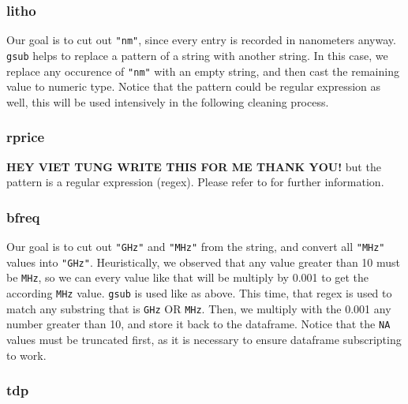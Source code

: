 \subsubsection*{litho}


Our goal is to cut out \verb|"nm"|, since every entry is recorded in nanometers anyway. \texttt{gsub} helps to replace a pattern 
of a string with another string. In this case, we replace any occurence of \verb|"nm"| with an empty string, and then cast the remaining 
value to numeric type. Notice that the pattern could be regular expression as well, this will be used intensively in the following cleaning
process.

\subsubsection*{rprice}


\textbf{HEY VIET TUNG WRITE THIS FOR ME THANK YOU!}
but the pattern is a regular expression (regex). Please refer to 
for further information.

\subsubsection*{bfreq}


Our goal is to cut out \verb|"GHz"| and \verb|"MHz"| from the string, and convert all \verb|"MHz"| values into \verb|"GHz"|. Heuristically,
we observed that any value greater than 10 must be \verb|MHz|, so we can every value like that will be multiply by 0.001 to get 
the according \verb|MHz| value. \texttt{gsub} is used like as above. This time, that regex is used to match any substring that is 
\verb|GHz| OR \verb|MHz|. Then, we multiply with the 0.001 any number greater than 10, and store it back to the dataframe. Notice that the
\texttt{NA} values must be truncated first, as it is necessary to ensure dataframe subscripting to work.

\subsubsection*{tdp}

